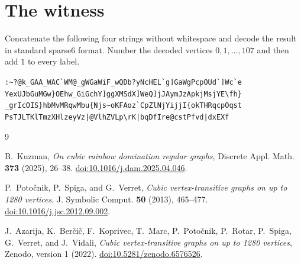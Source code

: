 \documentclass[11pt]{amsart}
\theoremstyle{remark}
\begin{document}
\appendix
\section{The witness}\label{app:witness}

Concatenate the following four strings without whitespace and decode the
result in standard sparse6 format.  Number the decoded vertices
$0,1,\ldots,107$ and then add $1$ to every label.

\begin{center}
\footnotesize
\verb+:~?@k_GAA_WAC`WM@_gWGaWiF_wQDb?yNcHEL`g]GaWgPcpOUd`]Wc`e+\\
\verb+YexUJbGuMGw}OEhw_GiGchY]ggXMSdX]WeQ]jJAymJzApkjMsjYE\fh}+\\
\verb+_grIcOIS}hbMvMRqwMbu{Njs~oKFAoz`CpZlNjYijjI{okTHRqcpOqst+\\
\verb+PsTJLTKlTmzXHlzeyVz|@VlhZVLp\rK|bqDfIre@cstPfvd|dxEXf+
\end{center}

\begin{thebibliography}{9}

B.~Kuzman,
\emph{On cubic rainbow domination regular graphs},
Discrete Appl. Math. \textbf{373} (2025), 26--38.
\href{https://doi.org/10.1016/j.dam.2025.04.046}
{doi:10.1016/j.dam.2025.04.046}.

P.~Poto\v{c}nik, P.~Spiga, and G.~Verret,
\emph{Cubic vertex-transitive graphs on up to 1280 vertices},
J. Symbolic Comput. \textbf{50} (2013), 465--477.
\href{https://doi.org/10.1016/j.jsc.2012.09.002}
{doi:10.1016/j.jsc.2012.09.002}.

J.~Azarija, K.~Ber\v{c}i\v{c}, F.~Koprivec, T.~Marc, P.~Poto\v{c}nik,
P.~Rotar, P.~Spiga, G.~Verret, and J.~Vidali,
\emph{Cubic vertex-transitive graphs on up to 1280 vertices},
Zenodo, version 1 (2022).
\href{https://doi.org/10.5281/zenodo.6576526}
{doi:10.5281/zenodo.6576526}.

\end{thebibliography}
\end{document}
